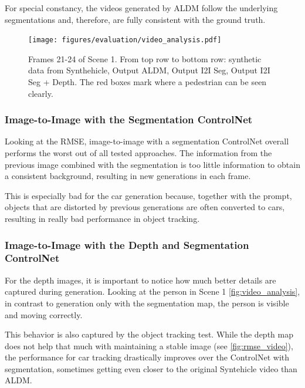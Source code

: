 For special constancy, the videos generated by ALDM follow the underlying segmentations and, therefore, are fully consistent with the ground truth.

\begin{figure}[H]
  \centering
  \texttt{[image: figures/evaluation/video\_analysis.pdf]}
  \caption{Frames 21-24 of Scene 1. From top row to bottom row:
synthetic data from Synthehicle, Output ALDM, Output I2I Seg, Output I2I Seg + Depth. The red boxes mark where a pedestrian can be seen clearly.}
  \label{fig:video_analysis}
  \clearpage
\end{figure}

\subsubsection{Image-to-Image with the Segmentation ControlNet}
Looking at the RMSE, image-to-image with a segmentation ControlNet overall performs the worst out of all tested approaches. The information from the previous image combined with the segmentation is too little information to obtain a consistent background, resulting in new generations in each frame.

This is especially bad for the car generation because, together with the prompt, objects that are distorted by previous generations are often converted to cars, resulting in really bad performance in object tracking.

\subsubsection{Image-to-Image with the Depth and Segmentation ControlNet}
For the depth images, it is important to notice how much better details are captured during generation. Looking at the person in Scene 1 \autoref{fig:video_analysis}, in contrast to generation only with the segmentation map, the person is visible and moving correctly. 

This behavior is also captured by the object tracking test. While the depth map does not help that much with maintaining a stable image (see \autoref{fig:rmse_video}), the performance for car tracking drastically improves over the ControlNet with segmentation, sometimes getting even closer to the original Syntehicle video than ALDM.


